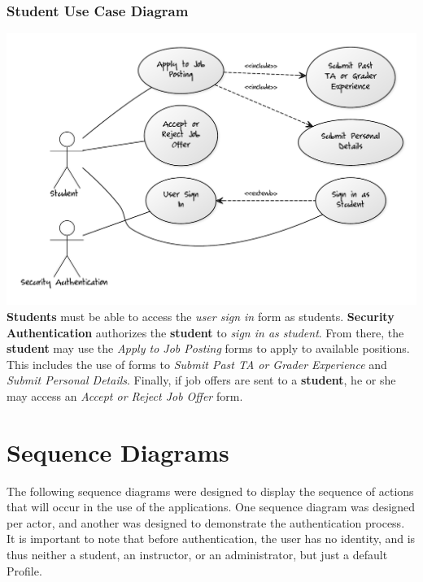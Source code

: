 \documentclass[12pt,openany]{report}
\begin{document}
\subsection{Student Use Case Diagram}
\includegraphics[scale=0.5]{model/Diagrams/UC/studentUC}
\\
\textbf{Students} must be able to access the \textit{user sign in} form as students.
\textbf{Security Authentication} authorizes the \textbf{student} to \textit{sign in as student}.
From there, the \textbf{student} may use the \textit{Apply to Job Posting} forms to apply to
available positions. This includes the use of forms to \textit{Submit Past TA or Grader Experience}
and \textit{Submit Personal Details}. Finally, if job offers are sent to a \textbf{student}, he or
she may access an \textit{Accept or Reject Job Offer} form.
\chapter{Sequence Diagrams}
The following sequence diagrams were designed to display the sequence of actions that will occur in
the use of the applications. One sequence diagram was designed per actor, and another was designed
to demonstrate the authentication process. It is important to note that before authentication, the
user has no identity, and is thus neither a student, an instructor, or an administrator, but just a
default Profile.
\end{document}
